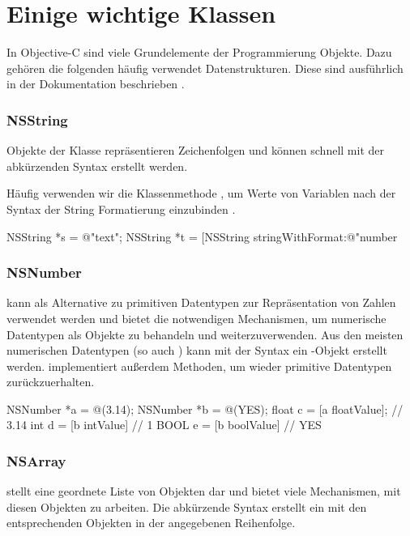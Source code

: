\documentclass[parskip=half, final]{scrreprt}
\begin{document}
\section{Einige wichtige Klassen}

In Objective-C sind viele Grundelemente der Programmierung Objekte. Dazu gehören die folgenden häufig verwendet Datenstrukturen. Diese sind ausführlich in der Dokumentation beschrieben .

\subsubsection{NSString}
Objekte der Klasse  repräsentieren Zeichenfolgen und können schnell mit der abkürzenden Syntax  erstellt werden.

Häufig verwenden wir die Klassenmethode , um Werte von Variablen nach der Syntax der String Formatierung einzubinden .

\begin{objclst}
NSString *s = @"text";
NSString *t = [NSString stringWithFormat:@"number %
\end{objclst}

\subsubsection{NSNumber}
 kann als Alternative zu primitiven Datentypen zur Repräsentation von Zahlen verwendet werden und bietet die notwendigen Mechanismen, um numerische Datentypen als Objekte zu behandeln und weiterzuverwenden. Aus den meisten numerischen Datentypen (so auch ) kann mit der Syntax  ein -Objekt erstellt werden.  implementiert außerdem Methoden, um wieder primitive Datentypen zurückzuerhalten.

\begin{objclst}
NSNumber *a = @(3.14);
NSNumber *b = @(YES);
float c = [a floatValue]; // 3.14
int d = [b intValue] // 1
BOOL e = [b boolValue] // YES
\end{objclst}

\subsubsection{NSArray}
 stellt eine geordnete Liste von Objekten dar und bietet viele Mechanismen, mit diesen Objekten zu arbeiten. Die abkürzende Syntax  erstellt ein  mit den entsprechenden Objekten in der angegebenen Reihenfolge.
\end{document}
